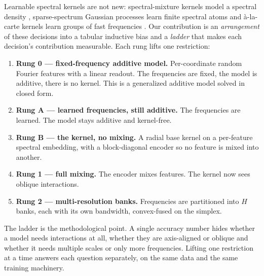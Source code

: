 \documentclass[11pt]{article}
\theoremstyle{definition}
\begin{document}
Learnable spectral kernels are not new: spectral-mixture kernels model a spectral density
\citep{wilson2013}, sparse-spectrum Gaussian processes learn finite spectral atoms
\citep{lazarogredilla2010} and \`a-la-carte kernels learn groups of fast frequencies
\citep{yang2015}. Our contribution is an \emph{arrangement} of these decisions into a tabular
inductive bias and a \emph{ladder} that makes each decision's contribution measurable. Each
rung lifts one restriction:
\begin{enumerate}\itemsep1pt
\item \textbf{Rung 0 --- fixed-frequency additive model.} Per-coordinate random Fourier
features with a linear readout. The frequencies are fixed, the model is additive, there is no
kernel. This is a generalized additive model \citep{hastie1990} solved in closed form.
\item \textbf{Rung A --- learned frequencies, still additive.} The frequencies are learned. The
model stays additive and kernel-free.
\item \textbf{Rung B --- the kernel, no mixing.} A radial base kernel on a per-feature spectral
embedding, with a block-diagonal encoder so no feature is mixed into another.
\item \textbf{Rung 1 --- full mixing.} The encoder mixes features. The kernel now sees oblique
interactions.
\item \textbf{Rung 2 --- multi-resolution banks.} Frequencies are partitioned into $H$ banks,
each with its own bandwidth, convex-fused on the simplex.
\end{enumerate}
The ladder is the methodological point. A single accuracy number hides whether a model needs
interactions at all, whether they are axis-aligned or oblique and whether it needs multiple
scales or only more frequencies. Lifting one restriction at a time answers each question
separately, on the same data and the same training machinery.
\end{document}
